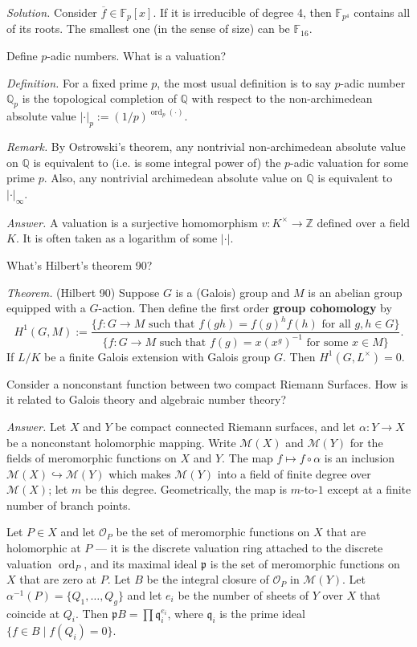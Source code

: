 \documentclass{mathproblems}
\newcommand\Q{\mathbb{Q}}
\newcommand\Z{\mathbb{Z}}
\newcommand\F{\mathbb{F}}
\begin{document}
\begin{questions}
\textit{Solution.} Consider $\overline{f}\in \F_p[x]$. If it is irreducible of degree 4, then $\F_{p^4}$ contains all of its roots. The smallest one (in the sense of size) can be $\F_{16}$.

\miquestion
{\color{blue} Define $p$-adic numbers. What is a valuation?}

\textit{Definition.} For a fixed prime $p$, the most usual definition is to say $p$-adic number $\Q_p$ is the topological completion of $\Q$ with respect to the non-archimedean absolute value $|\cdot|_p:=(1/p)^{\operatorname{ord}_p(\cdot)}$.

\textit{Remark.} By Ostrowski's theorem, any nontrivial non-archimedean absolute value on $\Q$ is equivalent to (i.e. is some integral power of) the $p$-adic valuation for some prime $p$. Also, any nontrivial archimedean absolute value on $\Q$ is equivalent to $|\cdot|_\infty$.

\textit{Answer.} A valuation is a surjective homomorphism $v:K^\times\to \Z$ defined over a field $K$. It is often taken as a logarithm of some $|\cdot|$.



\miquestion
{\color{blue} What's Hilbert's theorem 90?}

{\color{violet}
\textit{Theorem.} (Hilbert 90) Suppose $G$ is a (Galois) group and $M$ is an abelian group equipped with a $G$-action. Then define the first order \textbf{group cohomology} by
$$
H^1(G,M):=\frac{\{f:G\to M \text{ such that } f(gh)=f(g)^hf(h)\text{ for all }g,h\in G\}}{\{f:G\to M \text{ such that } f(g)=x(x^g)^{-1}\text{ for some } x\in M\}}.
$$
If $L/K$ be a finite Galois extension with Galois group $G$. Then $H^1(G,L^\times)=0$.
}

\miquestion
{\color{blue} Consider a nonconstant function between two compact Riemann Surfaces. How is it related to Galois theory and algebraic number theory?}

\textit{Answer.} Let $X$ and $Y$ be compact connected Riemann surfaces, and let $\alpha: Y \rightarrow X$ be a nonconstant holomorphic mapping. Write $\mathcal{M}(X)$ and $\mathcal{M}(Y)$ for the fields of meromorphic functions on $X$ and $Y$. The map $f \mapsto f \circ \alpha$ is an inclusion $\mathcal{M}(X) \hookrightarrow \mathcal{M}(Y)$ which makes $\mathcal{M}(Y)$ into a field of finite degree over $\mathcal{M}(X)$; let $m$ be this degree. Geometrically, the map is $m$-to-$1$ except at a finite number of branch points.

Let $P \in X$ and let $\mathcal{O}_P$ be the set of meromorphic functions on $X$ that are holomorphic at $P$ --- it is the discrete valuation ring attached to the discrete valuation $\operatorname{ord}_P$, and its maximal ideal $\mathfrak{p}$ is the set of meromorphic functions on $X$ that are zero at $P$. Let $B$ be the integral closure of $\mathcal{O}_P$ in $\mathcal{M}(Y)$. Let $\alpha^{-1}(P)=\{Q_1, \ldots, Q_g\}$ and let $e_i$ be the number of sheets of $Y$ over $X$ that coincide at $Q_i$. Then $\mathfrak{p} B=\prod \mathfrak{q}_i^{e_i}$, where $\mathfrak{q}_i$ is the prime ideal $\{f \in B \mid f(Q_i)=0\}$.
\end{questions}
\end{document}
